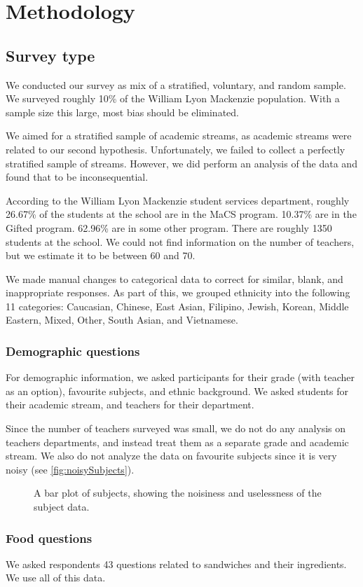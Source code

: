 \chapter{Methodology}

\section{Survey type}
We conducted our survey as mix of a stratified, voluntary, and random sample.
We surveyed roughly 10\% of the William Lyon Mackenzie population.
With a sample size this large, most bias should be eliminated.

We aimed for a stratified sample of academic streams, as academic streams were related to our second hypothesis.
Unfortunately, we failed to collect a perfectly stratified sample of streams.
However, we did perform an analysis of the data and found that to be inconsequential.

According to the William Lyon Mackenzie student services department, roughly 26.67\% of the students at the school are in the MaCS program.
10.37\% are in the Gifted program.
62.96\% are in some other program.
There are roughly 1350 students at the school.
We could not find information on the number of teachers, but we estimate it to be between 60 and 70.

We made manual changes to categorical data to correct for similar, blank, and inappropriate responses.
As part of this, we grouped ethnicity into the following 11 categories: Caucasian, Chinese, East Asian, Filipino, Jewish, Korean, Middle Eastern, Mixed, Other, South Asian, and Vietnamese.

\subsection*{Demographic questions}
For demographic information, we asked participants for their grade (with teacher as an option), favourite subjects, and ethnic background.
We asked students for their academic stream, and teachers for their department.

Since the number of teachers surveyed was small, we do not do any analysis on teachers departments, and instead treat them as a separate grade and academic stream.
We also do not analyze the data on favourite subjects since it is very noisy (see \vref{fig:noisySubjects}).

\begin{figure}[H]
	\caption{A bar plot of subjects, showing the noisiness and uselessness of the subject data.}
	\label{fig:noisySubjects}
\end{figure}

\subsection*{Food questions}
We asked respondents 43 questions related to sandwiches and their ingredients.
We use all of this data.
